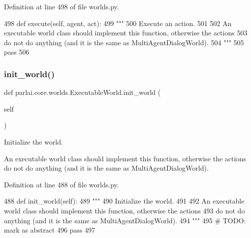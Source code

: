Definition at line 498 of file worlds.\+py.


\begin{DoxyCode}
498     \textcolor{keyword}{def }execute(self, agent, act):
499         \textcolor{stringliteral}{"""}
500 \textcolor{stringliteral}{        Execute an action.}
501 \textcolor{stringliteral}{}
502 \textcolor{stringliteral}{        An executable world class should implement this function, otherwise the actions}
503 \textcolor{stringliteral}{        do not do anything (and it is the same as MultiAgentDialogWorld).}
504 \textcolor{stringliteral}{        """}
505         \textcolor{keywordflow}{pass}
506 
\end{DoxyCode}
\mbox{\label{classparlai_1_1core_1_1worlds_1_1ExecutableWorld_a8bb31ec1d93a94cb261f89ce0992159a}} 
\subsubsection{\texorpdfstring{init\+\_\+world()}{init\_world()}}
{\footnotesize\ttfamily def parlai.\+core.\+worlds.\+Executable\+World.\+init\+\_\+world (\begin{DoxyParamCaption}\item[{}]{self }\end{DoxyParamCaption})}

\begin{DoxyVerb}Initialize the world.

An executable world class should implement this function, otherwise the actions
do not do anything (and it is the same as MultiAgentDialogWorld).
\end{DoxyVerb}
 

Definition at line 488 of file worlds.\+py.


\begin{DoxyCode}
488     \textcolor{keyword}{def }init\_world(self):
489         \textcolor{stringliteral}{"""}
490 \textcolor{stringliteral}{        Initialize the world.}
491 \textcolor{stringliteral}{}
492 \textcolor{stringliteral}{        An executable world class should implement this function, otherwise the actions}
493 \textcolor{stringliteral}{        do not do anything (and it is the same as MultiAgentDialogWorld).}
494 \textcolor{stringliteral}{        """}
495         \textcolor{comment}{# TODO: mark as abstract}
496         \textcolor{keywordflow}{pass}
497 
\end{DoxyCode}
\mbox{\label{classparlai_1_1core_1_1worlds_1_1ExecutableWorld_a69934ec2181a8b22269e02ab8b3bb1f2}} 
